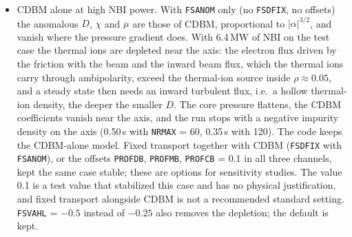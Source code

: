 \documentclass[11pt]{article}
\begin{document}
\begin{itemize}
  $|\alpha| \le 5\times10^{-3}$ a sigmoid joins the values of the two branches at $\alpha = \mp5\times10^{-3}$.
  The value used for $-5\times10^{-3}$ was that of the branch $\alpha - s$ at $+5\times10^{-3}$, so the form
  factor jumped there by about 2\% (1.6--2.6\% for $|s| \le 0.3$).  With 6.4\,MW, the offsets 0.1 and \texttt{NRMAX} =
  240, $\alpha$ of the fifth node came to $-5\times10^{-3}$ at 0.4414\,s, where the Picard map had no fixed
  point: the increment stayed at $5\times10^{-4}$ in 1000 or 3000 sweeps (also with \texttt{MDLPCK} = 3)
  and substeps were accepted without convergence at every $\Delta t$.  The end is now that of its own
  branch and the form factor is continuous; that step converges in 44 sweeps and the substeps accepted
  at 0.4413--0.4416\,s are gone.  Without CDBM and outside $|\alpha| \le 5\times10^{-3}$ nothing changes;
  in the standard CDBM cases the densities and pressures change by less than $10^{-7}$ (50 steps) and
  $10^{-8}$ (\texttt{FSCBSH} = 2, 1.2\,s), and with 6.4\,MW and \texttt{NRMAX} = 240 by $1$--$2\times10^{-5}$
  on the axis.  The failure of CDBM alone
  at 6.4\,MW (below) is not this: it comes at 0.3444 and 0.3447\,s with \texttt{NRMAX} = 120 before and
  after the change.
\item CDBM alone at high NBI power.  With \texttt{FSANOM} only (no \texttt{FSDFIX}, no offsets) the
  anomalous $D$, $\chi$ and $\mu$ are those of CDBM, proportional to $|\alpha|^{3/2}$, and vanish
  where the pressure gradient does.  With 6.4\,MW of NBI on the test case the thermal ions are
  depleted near the axis: the electron flux driven by the friction with the beam and the inward beam
  flux, which the thermal ions carry through ambipolarity, exceed the thermal-ion source inside
  $\rho\approx0.05$, and a steady state then needs an inward turbulent flux, i.e.\ a hollow
  thermal-ion density, the deeper the smaller $D$.  The core pressure flattens, the CDBM coefficients
  vanish near the axis, and the run stops with a negative impurity density on the axis (0.50\,s with
  \texttt{NRMAX} = 60, 0.35\,s with 120).
  The code keeps the CDBM-alone model.  Fixed transport together with CDBM (\texttt{FSDFIX} with
  \texttt{FSANOM}), or the offsets \texttt{PROFDB}, \texttt{PROFMB}, \texttt{PROFCB} = 0.1 in all
  three channels, kept the same case stable; these are options for sensitivity studies.  The value
  0.1 is a test value that stabilized this case and has no physical justification, and fixed
  transport alongside CDBM is not a recommended standard setting.  \texttt{FSVAHL} = $-0.5$ instead
  of $-0.25$ also removes the depletion; the default is kept.


\end{itemize}
\end{document}
